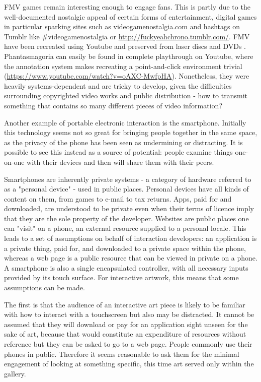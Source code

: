FMV games remain interesting enough to engage fans. This is partly due to the well-documented nostalgic appeal of certain forms of entertainment, digital games in particular sparking sites such as videogamenostalgia.com and hashtags on Tumblr like \#videogamenostalgia or \url{http://fuckyeahchrono.tumblr.com/}. FMV have been recreated using Youtube and preserved from laser discs and DVDs \parencite{laserdiscarcade}. Phantasmagoria can easily be found in complete playthrough on Youtube, where the annotation system makes recreating a point-and-click environment trivial (\url{https://www.youtube.com/watch?v=oAXC-MwfpHA}). Nonetheless, they were heavily systems-dependent and are tricky to develop, given the difficulties surrounding copyrighted video works and public distribution - how to transmit something that contains so many different pieces of video information?

Another example of portable electronic interaction is the smartphone. Initially this technology seems not so great for bringing people together in the same space, as the privacy of the phone has been seen as undermining or distracting. It is possible to see this instead as a source of potential: people examine things one-on-one with their devices and then will share them with their peers.

Smartphones are inherently private systems - a category of hardware referred to as a "personal device" - used in public places. Personal devices have all kinds of content on them, from games to e-mail to tax returns. Apps, paid for and downloaded, are understood to be private even when their terms of licence imply that they are the sole property of the developer. Websites are public places one can "visit" on a phone, an external resource supplied to a personal locale. This leads to a set of assumptions on behalf of interaction developers: an application is a private thing, paid for, and downloaded to a private space within the phone, whereas a web page is a public resource that can be viewed in private on a phone. A smartphone is also a single encapsulated controller, with all necessary inputs provided by its touch surface. For interactive artwork, this means that some assumptions can be made.

The first is that the audience of an interactive art piece is likely to be familiar with how to interact with a touchscreen but also may be distracted. It cannot be assumed that they will download or pay for an application sight unseen for the sake of art, because that would constitute an expenditure of resources without reference but they can be asked to go to a web page. People commonly use their phones in public. Therefore it seems reasonable to ask them for the minimal engagement of looking at something specific, this time art served only within the gallery. 

